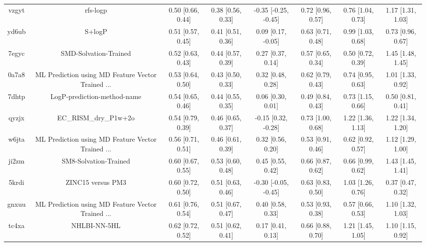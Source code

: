 \documentclass{article}
\begin{document}
\begin{center}
\begin{longtable}{|cccccccc|}
 vzgyt &                                           rfs-logp &  0.50 [0.66, 0.44] &  0.38 [0.56, 0.33] &  -0.35 [-0.25, -0.45] &  0.72 [0.96, 0.57] &     0.76 [1.04, 0.73] &     1.17 [1.31, 1.03] \\
 yd6ub &                                             S+logP &  0.51 [0.57, 0.45] &  0.41 [0.51, 0.36] &    0.09 [0.17, -0.05] &  0.63 [0.71, 0.48] &     0.99 [1.03, 0.68] &     0.73 [0.96, 0.67] \\
 7egyc &                              SMD-Solvation-Trained &  0.52 [0.63, 0.43] &  0.44 [0.57, 0.39] &     0.27 [0.37, 0.14] &  0.57 [0.65, 0.34] &     0.50 [0.72, 0.39] &     1.45 [1.48, 1.45] \\
 0a7a8 &  ML Prediction using MD Feature Vector Trained ... &  0.53 [0.64, 0.50] &  0.43 [0.50, 0.33] &     0.32 [0.48, 0.28] &  0.62 [0.79, 0.43] &     0.74 [0.95, 0.63] &     1.01 [1.33, 0.92] \\
 7dhtp &                        LogP-prediction-method-name &  0.54 [0.65, 0.46] &  0.44 [0.55, 0.35] &     0.06 [0.30, 0.01] &  0.49 [0.84, 0.43] &     0.73 [1.15, 0.66] &     0.50 [0.81, 0.41] \\
 qyzjx &                              EC\_RISM\_dry\_P1w+2o &  0.54 [0.79, 0.39] &  0.46 [0.65, 0.37] &   -0.15 [0.32, -0.28] &  0.73 [1.00, 0.68] &     1.22 [1.36, 1.13] &     1.22 [1.34, 1.20] \\
 w6jta &  ML Prediction using MD Feature Vector Trained ... &  0.56 [0.71, 0.51] &  0.46 [0.61, 0.39] &     0.32 [0.56, 0.20] &  0.53 [0.91, 0.46] &     0.62 [0.92, 0.57] &     1.12 [1.29, 1.00] \\
 ji2zm &                              SM8-Solvation-Trained &  0.60 [0.67, 0.55] &  0.53 [0.60, 0.48] &     0.45 [0.55, 0.42] &  0.66 [0.87, 0.62] &     0.66 [0.99, 0.62] &     1.43 [1.45, 1.41] \\
 5krdi &                                  ZINC15 versus PM3 &  0.60 [0.72, 0.50] &  0.51 [0.63, 0.46] &  -0.30 [-0.05, -0.45] &  0.63 [0.83, 0.50] &     1.03 [1.26, 0.76] &     0.37 [0.47, 0.32] \\
 gnxuu &  ML Prediction using MD Feature Vector Trained ... &  0.61 [0.76, 0.54] &  0.51 [0.67, 0.47] &     0.40 [0.58, 0.33] &  0.53 [0.93, 0.38] &     0.57 [0.66, 0.53] &     1.10 [1.32, 1.03] \\
 tc4xa &                                       NHLBI-NN-5HL &  0.62 [0.72, 0.52] &  0.51 [0.62, 0.41] &     0.17 [0.41, 0.13] &  0.66 [0.88, 0.70] &     1.21 [1.45, 1.05] &     1.10 [1.15, 0.92] \\

\end{longtable}
\end{center}
\end{document}
